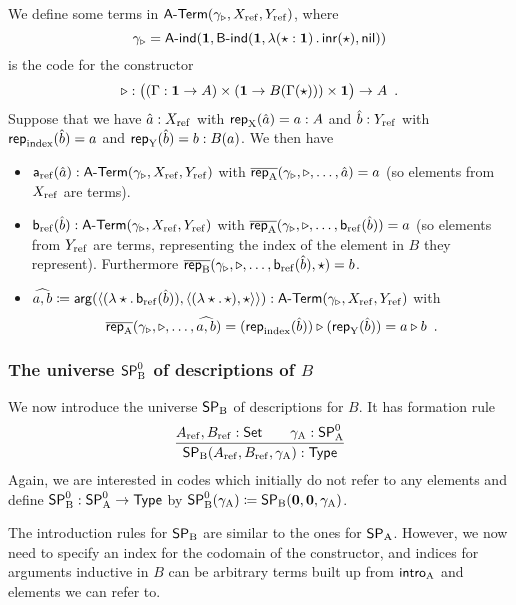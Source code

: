 \documentclass{schwicht}
\begin{document}
\begin{example}
  We define some terms in $\mathsf{A}\text{-}\mathsf{Term}(\gamma_{\triangleright}, X_{\mathrm{ref}}, Y_{\mathrm{ref}})$, where
  \[
  \gamma_{\triangleright} = \mathsf{A}\text{-}\mathsf{ind}(\mathbf{1}, \mathsf{B}\text{-}\mathsf{ind}(\mathbf{1},
  \lambda (\star : \mathbf{1})\,.\,\mathsf{inr}(\star), \mathsf{nil}))
  \]
  is the code for the constructor
  \[
  \triangleright : \big((\Gamma : \mathbf{1} \to A) \times (\mathbf{1} \to B(\Gamma(\star))) \times \mathbf{1}\big) \to A \enspace .
  \]
  Suppose that we have $\hat{a} : X_{\mathrm{ref}}$ with $\mathsf{rep}_{\mathrm{X}}(\hat{a}) = a : A$
  and $\hat{b} : Y_{\mathrm{ref}}$ with $\mathsf{rep}_{\mathrm{index}}(\hat{b}) = a$ and
  $\mathsf{rep}_{\mathrm{Y}}(\hat{b}) = b : B(a)$. We then have 
  \begin{itemize}
  \item $\mathsf{a}_{\mathrm{ref}}(\hat{a}) : \mathsf{A}\text{-}\mathsf{Term}(\gamma_{\triangleright}, X_{\mathrm{ref}}, Y_{\mathrm{ref}})$ with
  $\overline{\mathsf{rep}_{\mathrm{A}}}(\gamma_{\triangleright}, \triangleright, \ldots, \hat{a}) =
  a$ (so elements from $X_{\mathrm{ref}}$ are terms).
\item $\mathsf{b}_{\mathrm{ref}}(\hat{b}) : \mathsf{A}\text{-}\mathsf{Term}(\gamma_{\triangleright}, X_{\mathrm{ref}},
  Y_{\mathrm{ref}})$ with $\overline{\mathsf{rep}_{\mathrm{A}}}(\gamma_{\triangleright}, \triangleright,
  \ldots, \mathsf{b}_{\mathrm{ref}}(\hat{b})) = a$ (so elements from $Y_{\mathrm{ref}}$ are
  terms, representing the index of the element in $B$ they
  represent). Furthermore $\overline{\mathsf{rep}_{\mathrm{B}}}(\gamma_{\triangleright}, \triangleright, \ldots, \mathsf{b}_{\mathrm{ref}}(\hat{b}),
  \star) = b$.
\item  $\widehat{a,b} \coloneqq \mathsf{arg}(\langle (\lambda \star.\,\mathsf{b}_{\mathrm{ref}}(\hat{b})) ,
  \langle (\lambda \star.\,\star), \star\rangle\rangle) :
  \mathsf{A}\text{-}\mathsf{Term}(\gamma_{\triangleright}, X_{\mathrm{ref}}, Y_{\mathrm{ref}})$ with
  \[
      \overline{\mathsf{rep}_{\mathrm{A}}}(\gamma_{\triangleright}, \triangleright, \ldots, \widehat{a,b})
    = (\mathsf{rep}_{\mathrm{index}}(\hat{b})) \triangleright (\mathsf{rep}_{\mathrm{Y}}(\hat{b})) 
    = a \triangleright b \enspace .
  \]
\blackqed
\end{itemize}
\end{example}

\subsubsection{The universe $\mathsf{SP}^{0}_{\mathrm{B}}$ of descriptions of $B$}
\label{sec:SPB}

We now introduce the universe $\mathsf{SP}_{\mathrm{B}}$ of descriptions
for $B$. It has formation rule
%
\[
\infer{\SPB(\Aref, \Bref, \gammaA) : \TYPE}{\Aref, \Bref : \Set & \quad \gammaA : \SPAp}
\]
%
Again, we are interested in codes which initially do not refer to
any elements and define $\mathsf{SP}^{0}_{\mathrm{B}} : \mathsf{SP}^{0}_{\mathrm{A}} \to \mathsf{Type}$ by $\mathsf{SP}^{0}_{\mathrm{B}}(\gamma_{\mathrm{A}})
\coloneqq \mathsf{SP}_{\mathrm{B}}(\mathbf{0}, \mathbf{0}, \gamma_{\mathrm{A}})$.

The introduction rules for $\mathsf{SP}_{\mathrm{B}}$ are similar to the ones for $\mathsf{SP}_{\mathrm{A}}$.
However, we now need to specify an index for the codomain of the
constructor, and indices for arguments inductive in $B$ can be
arbitrary terms built up from $\mathsf{intro}_{\mathrm{A}}$ and elements we can refer to.
\end{document}

